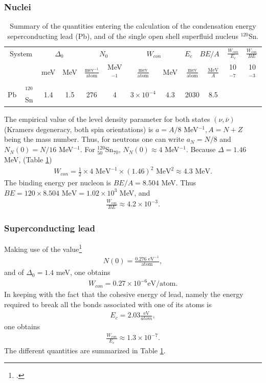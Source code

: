 \begin{subappendices}
\subsubsection{Nuclei}
\begin{table}
	\begin{tabular}{|c|c|c|c|c|c|c|c|c|c|c|c|}
		\hline
		\multicolumn{2}{|c|}{System} & \multicolumn{2}{|c|}{$\Delta_0$} &
		\multicolumn{2}{|c|}{$N_0$}&
		\multicolumn{2}{|c|}{$W_{con}$} &
		\multicolumn{2}{|c|}{$E_c\quad BE/A$} &
		\multicolumn{2}{|c|}{$\frac{W_{con}}{E_c}\quad \frac{W_{con}}{BE}$} \\
		\cline{3-12}
		\multicolumn{2}{|c|}{}& meV&MeV&$\frac{\text{mev}^{-1}}{\text{atom}}$&MeV$^{-1}$&$\frac{\text{mev}}{\text{atom}}$&MeV&$\frac{\text{mev}}{\text{atom}}$&$\frac{\text{MeV}}{A}$&10$^{-7}$&10$^{-3}$\\
		\cline{1-10}
		Pb&$^{120}$Sn& 1.4&1.5&276&4&$3\times10^{-4}$&4.3&2030&8.5&& \\
		\hline
	\end{tabular}\caption{Summary of the quantities entering the calculation of the condensation energy seperconducting lead (Pb), and of the single open shell superfluid nucleus $^{120}$Sn.}\label{Tab3.A.1}
\end{table}
The empirical value of the level density parameter for both states $(\nu,\bar \nu)$ (Kramers degeneracy, both spin orientations) is $a=A/8$ MeV$^{-1}, A=N+Z$ being the mass number. Thus, for neutrons one can write $a_N=N/8$ and $N_N(0)=N/16$ MeV$^{-1}$. For $^{120}_{50}$Sn$_{70}$, $N_N(0)\approx 4$ MeV$^{-1}$. Because $\Delta=1.46$ MeV, (Table \ref{Tab3.A.1})
\begin{align}\label{eqC3AppA3}
W_{con}=\frac{1}{2}\times 4\text{ MeV}^{-1}\times (1.46)^2\text{ MeV}^2\approx 4.3\text{ MeV}.
\end{align}
The binding energy per nucleon is $BE/A=8.504$ MeV. Thus $BE=120\times 8.504\text{ MeV}=1.02\times10^{3}$ MeV, and
\begin{align}\label{eqC3AppA4}
\frac{W_{con}}{BE}\approx 4.2\times10^{-3}.
\end{align}
\subsubsection{Superconducting lead}
Making use of the value\footnote{\cite{Beck:70}.}
\begin{align}\label{eqC3AppA5}
N(0)=\frac{0.276\text{ eV}^{-1}}{\text{atom}},
\end{align}
and of $\Delta_0=1.4$ meV, one obtains
\begin{align}\label{eqC3AppA6}
W_{con}=0.27\times10^{-6}\text{eV/atom}.
\end{align}
In keeping with the fact that the cohesive energy of lead, namely the energy required to break all the bonds associated with one of its atoms is
\begin{align}\label{eqC3AppA7}
E_c=2.03\frac{\text{eV}}{{atom}},
\end{align}
one obtains
\begin{align}\label{eqC3AppA8}
\frac{W_{con}}{E_c}\approx1.3\times10^{-7}.
\end{align}
The different quantities are summarized in Table \ref{Tab3.A.1}.

\end{subappendices}
